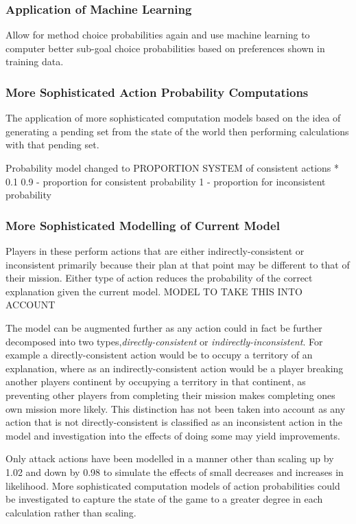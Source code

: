 \documentclass[parskip]{cs4rep}
\begin{document}
\subsubsection{Application of Machine Learning}

Allow for method choice probabilities again and use machine learning to computer better sub-goal choice probabilities based on preferences shown in training data.

\subsubsection{More Sophisticated Action Probability Computations}

The application of more sophisticated computation models based on the idea of generating a pending set from the state of the world then performing calculations with that pending set.

Probability model changed to PROPORTION SYSTEM of consistent actions * 0.1 
0.9 - proportion for consistent probability
1 - proportion for inconsistent probability

\subsubsection{More Sophisticated Modelling of Current Model}

Players in these perform actions that are either indirectly-consistent or inconsistent  primarily because their plan at that point may be different to that of their mission. Either type of action reduces the probability of the correct explanation given the current model. MODEL TO TAKE THIS INTO ACCOUNT

The model can be augmented further as any action could in fact be further decomposed into two types,\textit{directly-consistent} or \textit{indirectly-inconsistent}. For example a directly-consistent action would be to occupy a territory of an explanation, where as an indirectly-consistent action would be a player breaking another players continent by occupying a territory in that continent, as preventing other players from completing their mission makes completing ones own mission more likely. This distinction has not been taken into account as any action that is not directly-consistent is classified as an inconsistent action in the model and investigation into the effects of doing some may yield improvements.

Only attack actions have been modelled in a manner other than scaling up by 1.02 and down by 0.98 to simulate the effects of small decreases and increases in likelihood. More sophisticated computation models of action probabilities could be investigated to capture the state of the game to a greater degree in each calculation rather than scaling.
\end{document}
